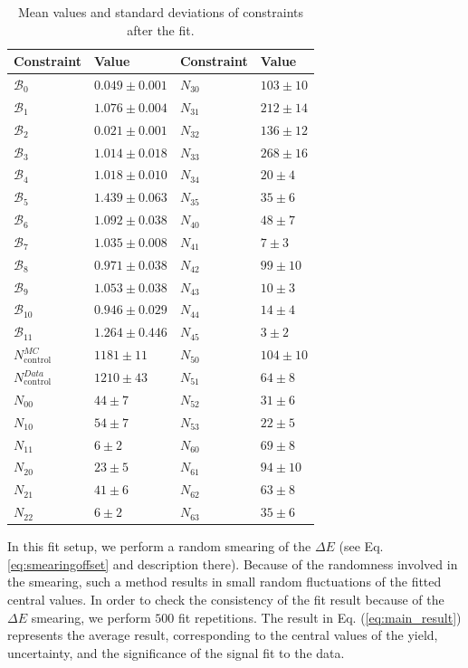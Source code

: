 \begin{table}[H]
	\centering
	\begin{tabular}{l|l||l|l}
		Constraint & Value & Constraint & Value \\
		\toprule
	$\mathcal{B}_{0}$ & $0.049 \pm 0.001$ & $N_{30}$ & $103 \pm 10$\\
	$\mathcal{B}_{1}$ & $1.076 \pm 0.004$ & $N_{31}$ & $212 \pm 14$\\
	$\mathcal{B}_{2}$ & $0.021 \pm 0.001$ & $N_{32}$ & $136 \pm 12$\\
	$\mathcal{B}_{3}$ & $1.014 \pm 0.018$ & $N_{33}$ & $268 \pm 16$\\
	$\mathcal{B}_{4}$ & $1.018 \pm 0.010$ & $N_{34}$ & $20 \pm 4$\\
	$\mathcal{B}_{5}$ & $1.439 \pm 0.063$ & $N_{35}$ & $35 \pm 6$\\
	$\mathcal{B}_{6}$ & $1.092 \pm 0.038$ & $N_{40}$ & $48 \pm 7$\\
	$\mathcal{B}_{7}$ & $1.035 \pm 0.008$ & $N_{41}$ & $7 \pm 3$\\
	$\mathcal{B}_{8}$ & $0.971 \pm 0.038$ & $N_{42}$ & $99 \pm 10$\\
	$\mathcal{B}_{9}$ & $1.053 \pm 0.038$ & $N_{43}$ & $10 \pm 3$\\
	$\mathcal{B}_{10}$ & $0.946 \pm 0.029$ & $N_{44}$ & $14 \pm 4$\\
	$\mathcal{B}_{11}$ & $1.264 \pm 0.446$ & $N_{45}$ & $3 \pm 2$\\
	$N_{\mathrm{control}}^{MC}$ & $1181 \pm 11$ & $N_{50}$ & $104 \pm 10$\\
	$N_{\mathrm{control}}^{Data}$ & $1210 \pm 43$ & $N_{51}$ & $64 \pm 8$\\
	$N_{00}$ & $44 \pm 7$ & $N_{52}$ & $31 \pm 6$\\
	$N_{10}$ & $54 \pm 7$ & $N_{53}$ & $22 \pm 5$\\
	$N_{11}$ & $6 \pm 2$ & $N_{60}$ & $69 \pm 8$\\
	$N_{20}$ & $23 \pm 5$ & $N_{61}$ & $94 \pm 10$\\
	$N_{21}$ & $41 \pm 6$ & $N_{62}$ & $63 \pm 8$\\
	$N_{22}$ & $6 \pm 2$ & $N_{63}$ & $35 \pm 6$\\
		\bottomrule
	\end{tabular}
	\captionsetup{width=.8\linewidth}
	\caption{Mean values and standard deviations of constraints after the fit.}
	\label{tab:constraints}
\end{table}

In this fit setup, we perform a random smearing of the $\Delta E$ (see Eq. \ref{eq:smearingoffset} and description there). Because of the randomness involved in the smearing, such a method results in small random fluctuations of the fitted central values. In order to check the consistency of the fit result because of the $\Delta E$ smearing, we perform $500$ fit repetitions. The result in Eq. (\ref{eq:main_result}) represents the average result, corresponding to the central values of the yield, uncertainty, and the significance of the signal fit to the data.

